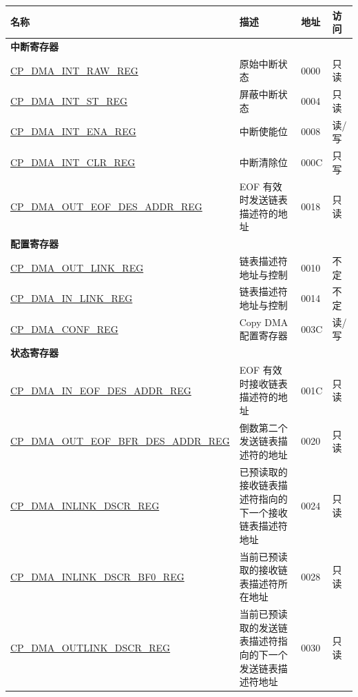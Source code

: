 \begin{longtable}{ | p{6cm} | p{7.2cm} | p{1.3cm} | p{1cm} | }
\hline\rowcolor{lightgray}
名称 & 描述 &  地址 & 访问 \\ \hline
\endhead
\multicolumn{4}{|l|}{\textbf{中断寄存器}} \\ \hline
\hyperref[regdesc:CPDMAINTRAWREG]{CP\_DMA\_INT\_RAW\_REG} & 原始中断状态 & \hexprefix{}0000 & 只读 \\ \hline
\hyperref[regdesc:CPDMAINTSTREG]{CP\_DMA\_INT\_ST\_REG} & 屏蔽中断状态 & \hexprefix{}0004 & 只读 \\ \hline
\hyperref[regdesc:CPDMAINTENAREG]{CP\_DMA\_INT\_ENA\_REG} & 中断使能位 & \hexprefix{}0008 & 读/写 \\ \hline
\hyperref[regdesc:CPDMAINTCLRREG]{CP\_DMA\_INT\_CLR\_REG} & 中断清除位 & \hexprefix{}000C & 只写 \\ \hline
\hyperref[regdesc:CPDMAOUTEOFDESADDRREG]{CP\_DMA\_OUT\_EOF\_DES\_ADDR\_REG} & EOF 有效时发送链表描述符的地址 & \hexprefix{}0018 & 只读 \\ \hline
\multicolumn{4}{|l|}{\textbf{配置寄存器}} \\ \hline
\hyperref[regdesc:CPDMAOUTLINKREG]{CP\_DMA\_OUT\_LINK\_REG} & 链表描述符地址与控制 & \hexprefix{}0010 & 不定 \\ \hline
\hyperref[regdesc:CPDMAINLINKREG]{CP\_DMA\_IN\_LINK\_REG} & 链表描述符地址与控制 & \hexprefix{}0014 & 不定 \\ \hline
\hyperref[regdesc:CPDMACONFREG]{CP\_DMA\_CONF\_REG} & Copy DMA 配置寄存器 & \hexprefix{}003C & 读/写 \\ \hline
\multicolumn{4}{|l|}{\textbf{状态寄存器}} \\ \hline
\hyperref[regdesc:CPDMAINEOFDESADDRREG]{CP\_DMA\_IN\_EOF\_DES\_ADDR\_REG} & EOF 有效时接收链表描述符的地址 & \hexprefix{}001C & 只读 \\ \hline
\hyperref[regdesc:CPDMAOUTEOFBFRDESADDRREG]{CP\_DMA\_OUT\_EOF\_BFR\_DES\_ADDR\newline\_REG} & 倒数第二个发送链表描述符的地址 & \hexprefix{}0020 & 只读 \\ \hline
\hyperref[regdesc:CPDMAINLINKDSCRREG]{CP\_DMA\_INLINK\_DSCR\_REG} & 已预读取的接收链表描述符指向的下一个接收链表描述符地址 & \hexprefix{}0024 & 只读 \\ \hline
\hyperref[regdesc:CPDMAINLINKDSCRBF0REG]{CP\_DMA\_INLINK\_DSCR\_BF0\_REG} & 当前已预读取的接收链表描述符所在地址 & \hexprefix{}0028 & 只读 \\ \hline
\hyperref[regdesc:CPDMAOUTLINKDSCRREG]{CP\_DMA\_OUTLINK\_DSCR\_REG} & 当前已预读取的发送链表描述符指向的下一个发送链表描述符地址 & \hexprefix{}0030 & 只读 \\ \hline

\end{longtable}
